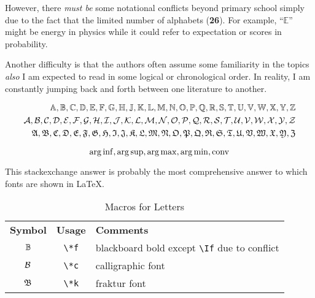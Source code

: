 However, there \textit{must be} some notational conflicts beyond primary school
simply due to the fact that the limited number of alphabets (\textbf{26}).
For example, ``$\mathbb{E}$'' might be energy in physics
while it could refer to expectation or scores in probability.

Another difficulty is that  the authors often assume some familiarity in the topics
\textit{also} I am expected to read in some logical or chronological order.
In reality, I am constantly jumping back and forth between one literature to another.

\begin{fullwidth}
    \begin{align*}
        \mathbb{A}, \mathbb{B}, \mathbb{C}, \mathbb{D}, \mathbb{E}, \mathbb{F}, \mathbb{G}, \mathbb{H}, \mathbb{J}, \mathbb{K}, \mathbb{L}, \mathbb{M}, \mathbb{N}, \mathbb{O}, \mathbb{P}, \mathbb{Q}, \mathbb{R}, \mathbb{S}, \mathbb{T}, \mathbb{U}, \mathbb{V}, \mathbb{W}, \mathbb{X}, \mathbb{Y}, \mathbb{Z}      \\
        \mathcal{A}, \mathcal{B}, \mathcal{C}, \mathcal{D}, \mathcal{E}, \mathcal{F}, \mathcal{G}, \mathcal{H}, \mathcal{I}, \mathcal{J}, \mathcal{K}, \mathcal{L}, \mathcal{M}, \mathcal{N}, \mathcal{O}, \mathcal{P}, \mathcal{Q}, \mathcal{R}, \mathcal{S}, \mathcal{T}, \mathcal{U}, \mathcal{V}, \mathcal{W}, \mathcal{X}, \mathcal{Y}, \mathcal{Z} \\
        \mathfrak{A}, \mathfrak{B}, \mathfrak{C}, \mathfrak{D}, \mathfrak{E}, \mathfrak{F}, \mathfrak{G}, \mathfrak{H}, \mathfrak{I}, \mathfrak{J}, \mathfrak{K}, \mathfrak{L}, \mathfrak{M}, \mathfrak{N}, \mathfrak{O}, \mathfrak{P}, \mathfrak{Q}, \mathfrak{R}, \mathfrak{S}, \mathfrak{T}, \mathfrak{U}, \mathfrak{V}, \mathfrak{W}, \mathfrak{X}, \mathfrak{Y}, \mathfrak{Z}
    \end{align*}
\end{fullwidth}
$$
    \operatorname*{arg\, inf}, \operatorname*{arg\, sup}, \operatorname*{arg\, max}, \operatorname*{arg\, min}, \mathrm{conv}
$$

This stackexchange answer 
is probably the most comprehensive answer to which fonts are shown in \LaTeX.

\begin{table}[h!]
    \centering\renewcommand{\arraystretch}{1.2}
    \begin{tabular}{ccl}
        \textbf{Symbol} & \textbf{Usage} & \textbf{Comments}                                 \\
        $\mathbb{B}$           & \verb|\*f|     & blackboard bold except \verb|\If| due to conflict \\
        $\mathcal{B}$           & \verb|\*c|     & calligraphic font                                 \\
        $\mathfrak{B}$           & \verb|\*k|     & fraktur font                                      \\
    \end{tabular}
    \label{tab:macro-letters}
    \caption{Macros for Letters}
\end{table}